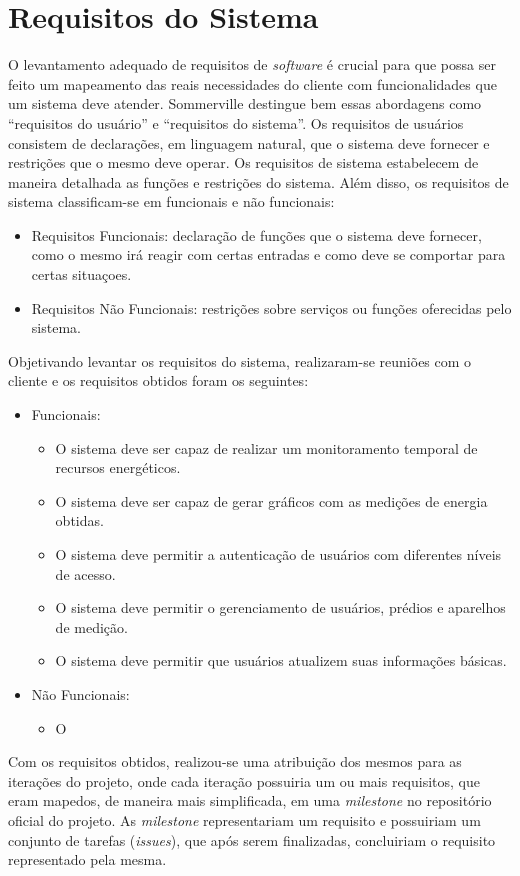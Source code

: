 \chapter{Requisitos do Sistema}

O levantamento adequado de requisitos de \textit{software} é crucial para
que possa ser feito um mapeamento das reais necessidades do cliente com
funcionalidades que um sistema deve atender. Sommerville \cite{sommerville_2006}
destingue bem essas abordagens como ``requisitos do usuário'' e ``requisitos do sistema''. Os requisitos de usuários consistem de declarações, em
linguagem natural, que o sistema deve fornecer e restrições que o mesmo deve
operar. Os requisitos de sistema estabelecem de maneira detalhada as
funções e restrições do sistema. Além disso, os requisitos de sistema
classificam-se em funcionais e não funcionais:

\begin{itemize}
    \item Requisitos Funcionais: declaração de funções que o sistema deve fornecer, como o mesmo irá reagir com certas entradas e como deve se comportar para certas situaçoes.
    \item Requisitos Não Funcionais: restrições sobre serviços ou funções oferecidas pelo sistema.
\end{itemize}

Objetivando levantar os requisitos do sistema, realizaram-se reuniões com o
cliente e os requisitos obtidos foram os seguintes:

\begin{itemize}
    \item Funcionais:
    \begin{itemize}
        \item O sistema deve ser capaz de realizar um monitoramento temporal de recursos energéticos.
        \item O sistema deve ser capaz de gerar gráficos com as medições de energia obtidas.
        \item O sistema deve permitir a autenticação de usuários com diferentes níveis de acesso.
        \item O sistema deve permitir o gerenciamento de usuários, prédios e aparelhos de medição.
        \item O sistema deve permitir que usuários atualizem suas informações básicas.
    \end{itemize}
    \item Não Funcionais:
    \begin{itemize}
        \item O
    \end{itemize}
\end{itemize}

Com os requisitos obtidos, realizou-se uma atribuição dos mesmos para
as iterações do projeto, onde cada iteração possuiria um ou mais requisitos,
que eram mapedos, de maneira mais simplificada, em uma \textit{milestone} no repositório oficial do projeto.
As \textit{milestone} representariam um requisito e possuiriam um conjunto
de tarefas (\textit{issues}), que após serem finalizadas, concluiriam
o requisito representado pela mesma.